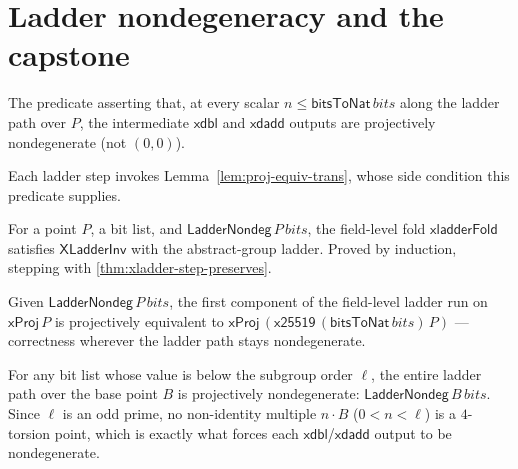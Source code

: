 \section{Ladder nondegeneracy and the capstone}

\begin{definition}
  \label{def:ladder-nondeg}
  \leanok
  The predicate asserting that, at every scalar $n \le \mathsf{bitsToNat}\,bits$
  along the ladder path over $P$, the intermediate $\mathsf{xdbl}$ and
  $\mathsf{xdadd}$ outputs are projectively nondegenerate (not $(0,0)$).
\end{definition}

Each ladder step invokes Lemma~\ref{lem:proj-equiv-trans}, whose side condition this
predicate supplies.

\begin{theorem}
  \label{thm:xladder-curve25519-correct}
  \leanok
  For a point $P$, a bit list, and $\mathsf{LadderNondeg}\,P\,bits$, the
  field-level fold $\mathsf{xladderFold}$ satisfies $\mathsf{XLadderInv}$
  with the abstract-group ladder. Proved by induction, stepping with
  \ref{thm:xladder-step-preserves}.
\end{theorem}

\begin{theorem}
  \label{thm:x25519-ladder-correct}
  \leanok
  Given $\mathsf{LadderNondeg}\,P\,bits$, the first component of the
  field-level ladder run on $\mathsf{xProj}\,P$ is projectively equivalent
  to $\mathsf{xProj}\,(\mathsf{x25519}\,(\mathsf{bitsToNat}\,bits)\,P)$ ---
  correctness wherever the ladder path stays nondegenerate.
\end{theorem}

\begin{theorem}
  \label{thm:curve25519-basepoint-laddernondeg}
  \leanok
  For any bit list whose value is below the subgroup order $\ell$, the
  entire ladder path over the base point $B$ is projectively nondegenerate:
  $\mathsf{LadderNondeg}\,B\,bits$. Since $\ell$ is an odd prime, no
  non-identity multiple $n\cdot B$ ($0 < n < \ell$) is a $4$-torsion point,
  which is exactly what forces each $\mathsf{xdbl}$/$\mathsf{xdadd}$ output
  to be nondegenerate.
\end{theorem}


